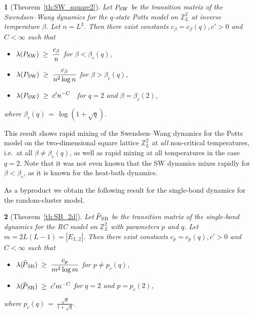 \documentclass{dis}
\theoremstyle{citing}
\newtheorem{cit}{}
\begin{document}
\begin{cit}[Theorem~\ref{th:SW_square2}]
Let ${P_{\rm SW}}$ be the transition matrix of the 
Swendsen--Wang dynamics for the $q$-state Potts model 
on ${\ensuremath{\mathbb{Z}}}^2_L$ at inverse temperature $\beta$. Let $n=L^2$. 
Then there exist constants $c_\beta=c_\beta(q),c'>0$ and $C<\infty$ 
such that 
\begin{itemize}
\item\quad $\displaystyle \lambda({P_{\rm SW}}) \;\ge\; \frac{c_\beta}{n}$ 
			\qquad\qquad\quad for $\beta < \beta_c(q)$, \vspace{2mm}
\item\quad $\displaystyle \lambda({P_{\rm SW}}) \;\ge\; \frac{c_\beta}{n^2 \log n}$ 
			\qquad\; for $\beta > \beta_c(q)$, \vspace{2mm}
\item\quad $\displaystyle \lambda({P_{\rm SW}}) \;\ge\; c' n^{-C}$ 
			\qquad\quad\, for $q=2$ and $\beta = \beta_c(2)$,
\end{itemize}
where $\beta_c(q)\,=\,\log(1+\sqrt{q})$.
\vspace{3mm}
\end{cit}

This result shows 
rapid mixing of the Swendsen--Wang dynamics for the Potts model 
on the 
two-dimensional square lattice ${\ensuremath{\mathbb{Z}}}_L^2$ at \emph{all} non-critical 
temperatures, i.e.~at all $\beta\neq\beta_c(q)$, as well as 
rapid mixing at all temperatures in the case $q=2$. 
Note that it was not even known that the SW dynamics mixes rapidly 
for $\beta<\beta_c$, as it is known for the heat-bath dynamics. 

As a byproduct we obtain the following result for the 
single-bond dynamics for the random-cluster model.

\begin{cit}[Theorem~\ref{th:SB_2d}]
Let ${{\raisebox{2pt}{ ${\widetilde{{}}}$ }\mkern-14mu P}_{\rm SB}}$ be the transition matrix of the 
single-bond dynamics for the RC model 
on ${\ensuremath{\mathbb{Z}}}^2_L$ with parameters $p$ and $q$. Let $m=2L(L-1)={\left\vert {E_{L,2}} \right\vert}$. 
Then there exist constants $c_p=c_p(q),c'>0$ and $C<\infty$ such that 
\begin{itemize}
\item\quad $\displaystyle \lambda({{\raisebox{2pt}{ ${\widetilde{{}}}$ }\mkern-14mu P}_{\rm SB}}) \;\ge\; \frac{c_p}{m^2 \log m}$ 
			\qquad for $p \neq p_c(q)$,\vspace{2mm}
\item\quad $\displaystyle \lambda({{\raisebox{2pt}{ ${\widetilde{{}}}$ }\mkern-14mu P}_{\rm SB}}) \;\ge\; c' m^{-C}$ 
			\qquad\quad for $q=2$ and $p = p_c(2)$,
\end{itemize}
where $p_c(q)\,=\,\frac{\sqrt{q}}{1+\sqrt{q}}$.
\vspace{3mm}
\end{cit}
\end{document}
